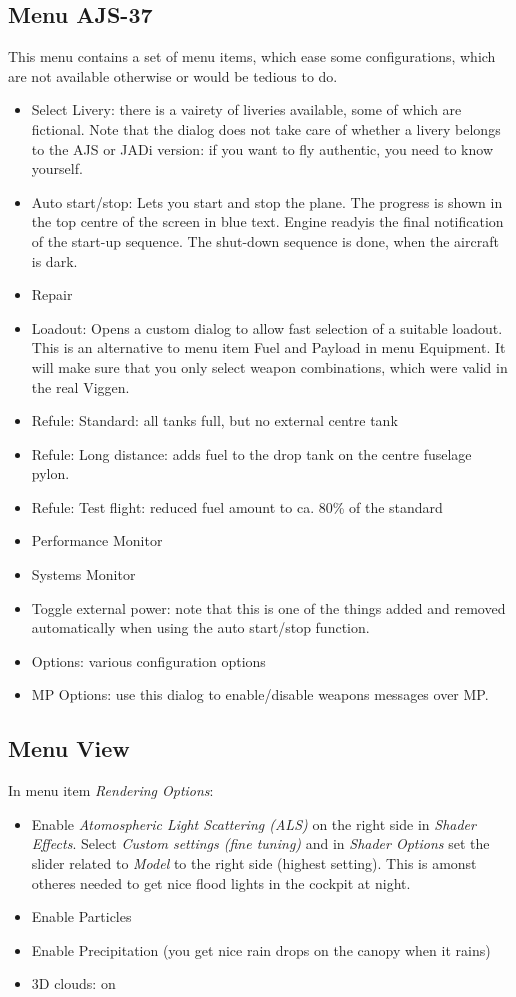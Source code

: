 \subsection{Menu AJS-37}
This menu contains a set of menu items, which ease some configurations, which are not available otherwise or would be tedious to do.
\begin{itemize}
\item Select Livery: there is a vairety of liveries available, some of which are fictional. Note that the dialog does not take care of whether a livery belongs to the AJS or JADi version: if you want to fly authentic, you need to know yourself.
\item Auto start/stop: Lets you start and stop the plane. The progress is shown in the top centre of the screen in blue text. \glqq Engine ready\grqq is the final notification of the start-up sequence. The shut-down sequence is done, when the aircraft is dark.
\item Repair
\item Loadout: Opens a custom dialog to allow fast selection of a suitable loadout. This is an alternative to menu item Fuel and Payload in menu Equipment. It will make sure that you only select weapon combinations, which were valid in the real Viggen.
\item Refule: Standard: all tanks full, but no external centre tank
\item Refule: Long distance: adds fuel to the drop tank on the centre fuselage pylon.
\item Refule: Test flight: reduced fuel amount to ca. 80\% of the standard
\item Performance Monitor
\item Systems Monitor
\item Toggle external power: note that this is one of the things added and removed automatically when using the auto start/stop function.
\item Options: various configuration options
\item MP Options: use this dialog to enable/disable weapons messages over MP.
\end{itemize}

\subsection{Menu View}
In menu item \emph{Rendering Options}:
\begin{itemize}
\item Enable \emph{Atomospheric Light Scattering (ALS)} on the right side in \emph{Shader Effects}. Select \emph{Custom settings (fine tuning)} and in \emph{Shader Options} set the slider related to \emph{Model} to the right side (highest setting). This is amonst otheres needed to get nice flood lights in the cockpit at night.
\item Enable Particles
\item Enable Precipitation (you get nice rain drops on the canopy when it rains)
\item 3D clouds: on
\end{itemize}

